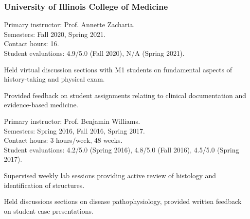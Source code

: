 \documentclass[%
DIV=19,
]{komacv}
\begin{document}
\begin{longcv}
\subsubsection{University of Illinois College of Medicine}

{Primary instructor: Prof. Annette Zacharia.\\
Semesters: Fall 2020, Spring 2021.\\
Contact hours: 16.\\
Student evaluations: 4.9/5.0 (Fall 2020), N/A (Spring 2021).
\begin{compactitem}
\item Held virtual discussion sections with M1 students on fundamental aspects of history-taking and physical exam.
\item Provided feedback on student assignments relating to clinical documentation and evidence-based medicine.
\end{compactitem}}

{Primary instructor: Prof. Benjamin Williams.\\
Semesters: Spring 2016, Fall 2016, Spring 2017.\\
Contact hours: 3 hours/week, 48 weeks.\\
Student evaluations: 4.2/5.0 (Spring 2016), 4.8/5.0 (Fall 2016), 4.5/5.0 (Spring 2017).
\begin{compactitem}
\item Supervised weekly lab sessions providing active review of histology and identification of structures.
\item Held discussions sections on disease pathophysiology, provided written feedback on student case presentations.
\end{compactitem}}

%


\end{longcv}
\end{document}
